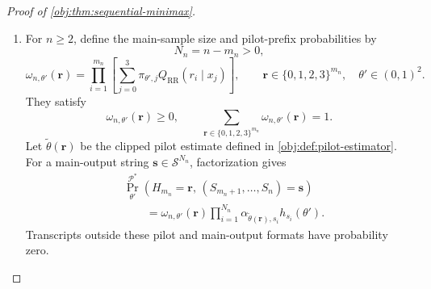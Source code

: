 \begin{proof}[Proof of \cref{obj:thm:sequential-minimax}]
\begin{enumerate}
Channel normalization and the affine dependence of the pattern masses give
\[
\sum_S\alpha_{\eta,S}h_S(\theta')=1,
\qquad
\sum_S\alpha_{\eta,S}g_S=0,
\qquad
h_S(\theta')=h_S(\eta)+g_S^\top(\theta'-\eta).
\]
Therefore
\[
\begin{aligned}
\sum_S\alpha_{\eta,S}h_S(\theta')\phi_\eta(S)
&=
\frac1{J_\eta}
\left[
\sum_S\alpha_{\eta,S}g_S^\top v_\eta
+
(\theta'-\eta)^\top\mathcal I_\eta v_\eta
\right]\\
&=
c^\top(\theta'-\eta)
=
\tau(\theta')-\tau(\eta).
\end{aligned}
\]
At the diagonal,
\[
\begin{aligned}
\sum_S\alpha_{\eta,S}h_S(\eta)\phi_\eta(S)^2
&=
\frac1{J_\eta^2}
\sum_S
\alpha_{\eta,S}\frac{(g_S^\top v_\eta)^2}{h_S(\eta)}\\
&=\frac1{J_\eta}=V^*(\eta,p,\varepsilon).
\end{aligned}
\]
Consequently,
\[
\sigma^2(\theta',\eta)
=
\sum_S\alpha_{\eta,S}h_S(\theta')
\left[
\phi_\eta(S)-\bigl(\tau(\theta')-\tau(\eta)\bigr)
\right]^2,
\]
and
\[
0\le\sigma^2(\theta',\eta)\le C_\phi^2,
\qquad
\sigma^2(\eta,\eta)=V^*(\eta,p,\varepsilon).
\]
The upper bound follows by bounding the uncentered second moment by \(C_\phi^2\) and subtracting the squared mean.

\item
For \(n\ge2\), define the main-sample size and pilot-prefix probabilities by
\[
N_n=n-m_n>0,
\]
\[
\omega_{n,\theta'}(\mathbf r)
=
\prod_{i=1}^{m_n}
\left[
\sum_{j=0}^3
\pi_{\theta',j}Q_{\mathrm{RR}}(r_i\mid x_j)
\right],
\qquad
\mathbf r\in\{0,1,2,3\}^{m_n},
\quad \theta'\in(0,1)^2.
\]
They satisfy
\[
\omega_{n,\theta'}(\mathbf r)\ge0,
\qquad
\sum_{\mathbf r\in\{0,1,2,3\}^{m_n}}
\omega_{n,\theta'}(\mathbf r)=1.
\]
Let \(\widetilde\theta(\mathbf r)\) be the clipped pilot estimate defined in \cref{obj:def:pilot-estimator}. For a main-output string
\(\mathbf s\in\mathcal S^{N_n}\), factorization gives
\[
\begin{aligned}
&\Pr_{\theta'}^{\mathcal P^*}
\!\left(H_{m_n}=\mathbf r,\,
(S_{m_n+1},\ldots,S_n)=\mathbf s\right)\\
&\qquad=
\omega_{n,\theta'}(\mathbf r)
\prod_{i=1}^{N_n}
\alpha_{\widetilde\theta(\mathbf r),s_i}
h_{s_i}(\theta').
\end{aligned}
\]
Transcripts outside these pilot and main-output formats have probability zero.


\end{enumerate}
\end{proof}
